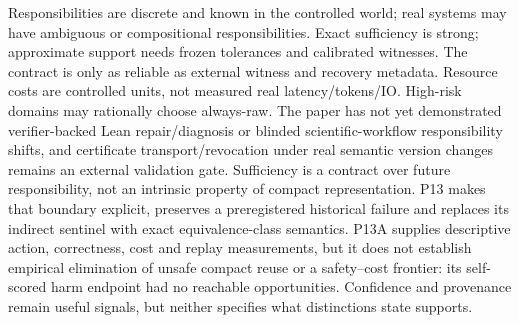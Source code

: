 \markdownRendererDocumentBegin
\markdownRendererSectionBegin
{}\markdownRendererInterblockSeparator
{}Responsibilities are discrete and known in the controlled world; real systems may have ambiguous or compositional responsibilities. Exact sufficiency is strong; approximate support needs frozen tolerances and calibrated witnesses. The contract is only as reliable as external witness and recovery metadata. Resource costs are controlled units, not measured real latency/tokens/IO. High-risk domains may rationally choose always-raw. The paper has not yet demonstrated verifier-backed Lean repair/diagnosis or blinded scientific-workflow responsibility shifts, and certificate transport/revocation under real semantic version changes remains an external validation gate.\markdownRendererInterblockSeparator
{}Sufficiency is a contract over future responsibility, not an intrinsic property of compact representation. P13 makes that boundary explicit, preserves a preregistered historical failure and replaces its indirect sentinel with exact equivalence-class semantics. P13A supplies descriptive action, correctness, cost and replay measurements, but it does not establish empirical elimination of unsafe compact reuse or a safety–cost frontier: its self-scored harm endpoint had no reachable opportunities. Confidence and provenance remain useful signals, but neither specifies what distinctions state supports.\markdownRendererInterblockSeparator
{}
\markdownRendererSectionEnd \markdownRendererDocumentEnd
